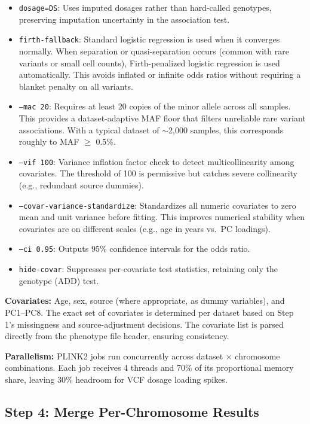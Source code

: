 \documentclass[11pt,letterpaper]{article}
\begin{document}
\begin{itemize}[nosep]
    \item \texttt{dosage=DS}: Uses imputed dosages rather than hard-called genotypes, preserving imputation uncertainty in the association test.
    \item \texttt{firth-fallback}: Standard logistic regression is used when it converges normally. When separation or quasi-separation occurs (common with rare variants or small cell counts), Firth-penalized logistic regression is used automatically. This avoids inflated or infinite odds ratios without requiring a blanket penalty on all variants.
    \item \texttt{--mac 20}: Requires at least 20 copies of the minor allele across all samples. This provides a dataset-adaptive MAF floor that filters unreliable rare variant associations. With a typical dataset of $\sim$2,000 samples, this corresponds roughly to MAF $\geq$ 0.5\%.
    \item \texttt{--vif 100}: Variance inflation factor check to detect multicollinearity among covariates. The threshold of 100 is permissive but catches severe collinearity (e.g., redundant source dummies).
    \item \texttt{--covar-variance-standardize}: Standardizes all numeric covariates to zero mean and unit variance before fitting. This improves numerical stability when covariates are on different scales (e.g., age in years vs.\ PC loadings).
    \item \texttt{--ci 0.95}: Outputs 95\% confidence intervals for the odds ratio.
    \item \texttt{hide-covar}: Suppresses per-covariate test statistics, retaining only the genotype (ADD) test.
\end{itemize}

\textbf{Covariates:} Age, sex, source (where appropriate, as dummy variables), and PC1--PC8. The exact set of covariates is determined per dataset based on Step 1's missingness and source-adjustment decisions. The covariate list is parsed directly from the phenotype file header, ensuring consistency.

\textbf{Parallelism:} PLINK2 jobs run concurrently across dataset $\times$ chromosome combinations. Each job receives 4 threads and 70\% of its proportional memory share, leaving 30\% headroom for VCF dosage loading spikes.

\subsection{Step 4: Merge Per-Chromosome Results}
\label{sec:step4}
\end{document}
